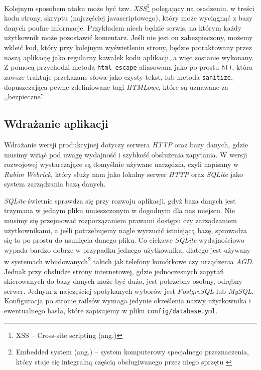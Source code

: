 \documentclass[12pt,twoside]{report}
\begin{document}
Kolejnym sposobem ataku może być tzw. \emph{XSS}\footnote{XSS -- Cross-site scripting
(ang.)} polegający na osadzeniu, w treści kodu strony, skryptu (najczęściej
javascriptowego), który może wyciągnąć z bazy danych poufne informacje. Przykładem niech
będzie serwis, na którym każdy użytkownik może pozostawić komentarz. Jeśli nie jest on
zabezpieczony, możemy wkleić kod, który przy kolejnym wyświetleniu strony, będzie potraktowany
przez naszą aplikację jako regularny kawałek kodu aplikacji, a więc zostanie wykonany.\\
Z pomocą przychodzi metoda \texttt{html\_escape} aliasowana jako po prostu \texttt{h()},
która zawsze traktuje przekazane słowa jako czysty tekst, lub metoda \texttt{sanitize},
dopuszczająca pewne zdefiniowane tagi \emph{HTMLowe}, które są uznawane za ,,bezpieczne''.


\subsection{Wdrażanie aplikacji}
Wdrażanie wersji produkcyjnej dotyczy serwera \emph{HTTP} oraz bazy danych, gdzie musimy
wziąć pod uwagę wydajność i szybkość obsłużenia zapytania. W wersji rozwojowej
wystarczające są domyślnie używane narzędzia, czyli napisany w \emph{Rubim} \emph{Webrick},
który służy nam jako lokalny serwer \emph{HTTP} oraz \emph{SQLite} jako system
zarządzania bazą danych.


\emph{SQLite} świetnie sprawdza się przy rozwoju aplikacji, gdyż baza danych jest trzymana
w jednym pliku umieszczonym w dogodnym dla nas miejscu. Nie musimy się przejmować
rozporzązaniem prawami dostępu czy zarządzaniem użytkownikami, a jeśli potrzebujemy nagle
wyrzucić istniejącą bazę, sprowadza się to po prostu do usunięcia danego pliku.
Co ciekawe \emph{SQLite} wydajnościowo wypada bardzo dobrze w przypadku jednego
użytkownika, dlatego jest używany w systemach wbudowanych\footnote{Embedded system (ang.) --
system komputerowy specjalnego przeznaczenia, który staje się integralną częścią
obsługiwanego przez niego sprzętu \cite{embedded-system}} takich jak telefony komórkowe
czy urządzenia \emph{AGD}. Jednak przy obsłudze strony internetowej, gdzie jednoczesnych zapytań
skierowanych do bazy danych może być dużo, jest potrzebny osobny, odrębny serwer. Jednym
z najczęściej spotykanych wyborów jest \emph{PostgreSQL} lub \emph{MySQL}. Konfiguracja
po stronie railsów wymaga jedynie określenia nazwy użytkownika i ewentualnego hasła, które
zapisujemy w pliku \texttt{config/database.yml}.
\end{document}
